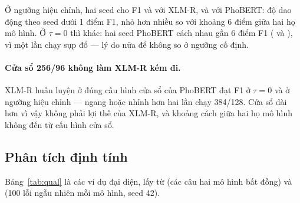 Ở ngưỡng hiệu chỉnh, hai seed cho F1 \SeedXlmrSTunedFone{} và \SeedXlmrSThirteenTunedFone{} với XLM-R,
\SeedPhobertSTunedFone{} và \SeedPhobertSThirteenTunedFone{} với PhoBERT: độ dao động theo seed dưới 1 điểm F1,
nhỏ hơn nhiều so với khoảng 6 điểm giữa hai họ mô hình. Ở $\tau = 0$ thì khác: hai seed PhoBERT cách nhau gần 6
điểm F1 (\SeedPhobertSFone{} và \SeedPhobertSThirteenFone), vì một lần chạy sụp đổ --- lý do nữa để không so
ở ngưỡng cố định.

\paragraph{Cửa sổ 256/96 không làm XLM-R kém đi.} XLM-R huấn luyện ở đúng cấu hình cửa sổ của PhoBERT đạt F1
\SeedXlmrTwoFiftySixFone{} ở $\tau = 0$ và \SeedXlmrTwoFiftySixTunedFone{} ở ngưỡng hiệu chỉnh --- ngang hoặc
nhỉnh hơn hai lần chạy 384/128. Cửa sổ dài hơn vì vậy không phải lợi thế của XLM-R, và khoảng cách giữa hai họ
mô hình không đến từ cấu hình cửa sổ.

\subsection{Phân tích định tính}
\label{sec:qualitative}

Bảng~\ref{tab:qual} là các ví dụ đại diện, lấy từ  (các câu
hai mô hình bất đồng) và  (100 lỗi ngẫu nhiên mỗi mô hình, seed 42).

